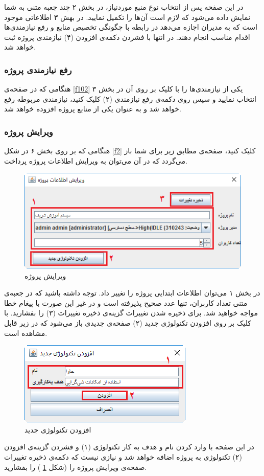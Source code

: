 در این صفحه پس از انتخاب نوع منبع موردنیاز، در بخش ۲ چند جعبه متنی به شما نمایش داده می‌شود که لازم است آن‌ها را تکمیل نمایید. در بهش ۳ اطلاعاتی موجود است که به مدیران اجازه می‌دهد در رابطه با چگونگی تخصیص منابع و رفع نیازمندی‌ها اقدام مناسب انجام دهند. در انتها با فشردن دکمه‌ی افزودن (۴) نیازمندی پروژه ثبت خواهد شد.

\subsubsection{رفع نیازمندی پروژه}
هنگامی که در صفحه‌ی 
\ref{f102}
یکی از نیازمندی‌ها را با کلیک بر روی آن در بخش ۳ انتخاب نمایید و سپس روی دکمه‌ی رفع نیازمندی (۲) کلیک کنید، نیازمندی مربوطه رفع خواهد شد و به عنوان یکی از منابع پروژه افزوده خواهد شد.


\subsubsection{ویرایش پروژه}
هنگامی که بر روی بخش ۶ در شکل
\ref{f2}
کلیک کنید، صفحه‌ی مطابق زیر برای شما باز می‌گردد که در آن می‌توان  به ویرایش اطلاعات پروژه پرداخت.

\begin{figure}[H]
	\centering
	\includegraphics[scale=0.5]{img/manual/editProject}
	\caption{ویرایش پروژه}
	\label{f6}
\end{figure}
در بخش ۱ می‌توان اطلاعات ابتدایی پروژه را تغییر داد. توجه داشته باشید که در جعبه‌ی متنی تعداد کاربران، تنها عدد صحیح پذیرفته است و در غیر این صورت با پیغام خطا مواجه خواهید شد.  برای ذخیره شدن تغییرات گزینه‌ی ذخیره تغییرات (۳) را بفشارید. با کلیک بر روی افزودن تکنولوژی جدید (۲) صفحه‌ی جدیدی باز می‌شود که در زیر قابل مشاهده است.
\begin{figure}[H]
	\centering
	\includegraphics[scale=0.7]{img/manual/addTech}
	\caption{ افزودن تکنولوژی جدید}
	\label{f7}
\end{figure}
در این صفحه با وارد کردن نام و هدف به کار تکنولوژی (۱) و فشردن گزینه‌ی افزودن (۲) تکنولوژی به پروژه اضافه خواهد شد و نیازی نیست که دکمه‌ی ذخیره تغییرات صفحه‌ی ویرایش پروژه را (شکل
\ref{f6}
)
را بفشارید.

